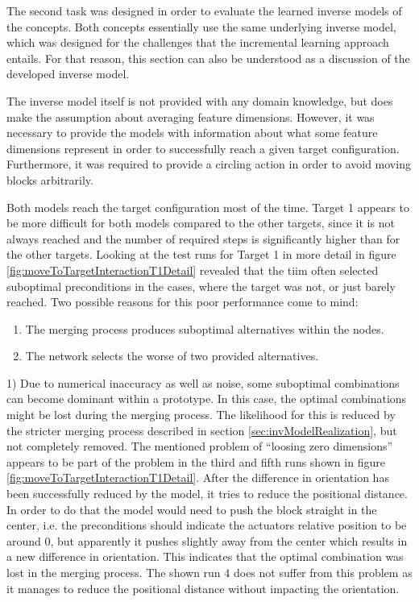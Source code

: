The second task was designed in order to evaluate the learned inverse models of the concepts. Both concepts essentially use the same underlying inverse model, which was designed for the challenges that the incremental learning approach entails. 
For that reason, this section can also be understood as a discussion of the developed inverse model.

The inverse model itself is not provided with any domain knowledge, but does make the assumption about averaging feature dimensions. 
However, it was necessary to provide the models with information about what some feature dimensions represent in order to successfully reach a given target configuration. 
Furthermore, it was required to provide a circling action in order to avoid moving blocks arbitrarily.

Both models reach the target configuration most of the time. Target 1 appears to be more difficult for both models compared to the other targets, since it is not always reached and the number of required steps is significantly higher than for the other targets. 
Looking at the test runs for Target 1 in more detail in figure \ref{fig:moveToTargetInteractionT1Detail} revealed that the \gls{tiim} often selected suboptimal preconditions in the cases, where the target was not, or just barely reached.
Two possible reasons for this poor performance come to mind:
\begin{enumerate}
\item The merging process produces suboptimal alternatives within the nodes.
\item The network selects the worse of two provided alternatives.
\end{enumerate}

1) Due to numerical inaccuracy as well as noise, some suboptimal combinations can become dominant within a prototype. In this case, the optimal combinations might be lost during the merging process. The likelihood for this is reduced by the stricter merging process described in section \ref{sec:invModelRealization}, but not completely removed. The mentioned problem of \enquote{loosing zero dimensions} appears to be part of the problem in the third and fifth runs shown in figure \ref{fig:moveToTargetInteractionT1Detail}. After the difference in orientation has been successfully reduced by the model, it tries to reduce the positional distance. In order to do that the model would need to push the block straight in the center, i.e. the preconditions should indicate the actuators relative position to be around 0, but apparently it pushes slightly away from the center which results in a new difference in orientation. This indicates that the optimal combination was lost in the merging process. The shown run 4 does not suffer from this problem as it manages to reduce the positional distance without impacting the orientation.

